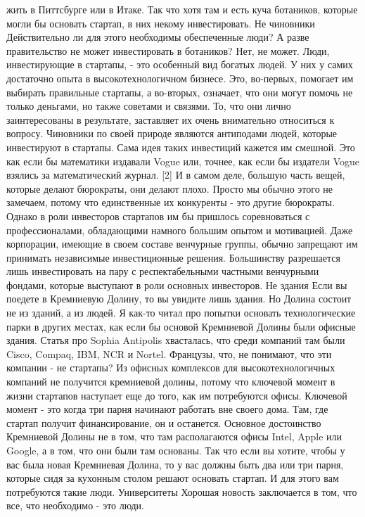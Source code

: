 \documentclass[ebook,12pt,oneside,openany]{memoir}
\begin{document}
жить в Питтсбурге или в Итаке. Так что хотя там и есть куча ботаников,
которые могли бы основать стартап, в них некому инвестировать. Не
чиновники Действительно ли для этого необходимы обеспеченные люди? А
разве правительство не может инвестировать в ботаников? Нет, не может.
Люди, инвестирующие в стартапы, - это особенный вид богатых людей. У
них у самих достаточно опыта в высокотехнологичном бизнесе. Это,
во-первых, помогает им выбирать правильные стартапы, а во-вторых,
означает, что они могут помочь не только деньгами, но также советами и
связями. То, что они лично заинтересованы в результате, заставляет их
очень внимательно относиться к вопросу. Чиновники по своей природе
являются антиподами людей, которые инвестируют в стартапы. Сама идея
таких инвестиций кажется им смешной. Это как если бы математики
издавали Vogue или, точнее, как если бы издатели Vogue взялись за
математический журнал. [2] И в самом деле, большую часть вещей,
которые делают бюрократы, они делают плохо. Просто мы обычно этого не
замечаем, потому что единственные их конкуренты - это другие
бюрократы. Однако в роли инвесторов стартапов им бы пришлось
соревноваться с профессионалами, обладающими намного большим опытом и
мотивацией. Даже корпорации, имеющие в своем составе венчурные группы,
обычно запрещают им принимать независимые инвестиционные решения.
Большинству разрешается лишь инвестировать на пару с респектабельными
частными венчурными фондами, которые выступают в роли основных
инвесторов. Не здания Если вы поедете в Кремниевую Долину, то вы
увидите лишь здания. Но Долина состоит не из зданий, а из людей. Я
как-то читал про попытки основать технологические парки в других
местах, как если бы основой Кремниевой Долины были офисные здания.
Статья про Sophia Antipolis хвасталась, что среди компаний там были
Cisco, Compaq, IBM, NCR и Nortel. Французы, что, не понимают, что эти
компании - не стартапы? Из офисных комплексов для высокотехнологичных
компаний не получится кремниевой долины, потому что ключевой момент в
жизни стартапов наступает еще до того, как им потребуются офисы.
Ключевой момент - это когда три парня начинают работать вне своего
дома. Там, где стартап получит финансирование, он и останется.
Основное достоинство Кремниевой Долины не в том, что там располагаются
офисы Intel, Apple или Google, а в том, что они были там основаны. Так
что если вы хотите, чтобы у вас была новая Кремниевая Долина, то у вас
должны быть два или три парня, которые сидя за кухонным столом решают
основать стартап. И для этого вам потребуются такие люди. Университеты
Хорошая новость заключается в том, что все, что необходимо - это люди.
\end{document}
